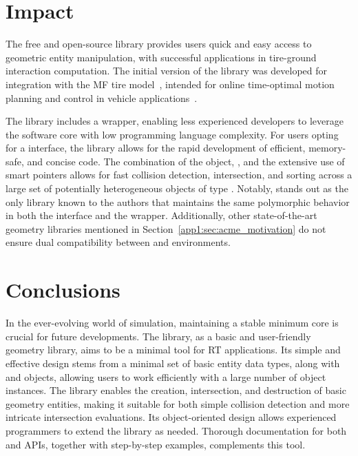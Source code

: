 \section{Impact}

The free and open-source \Acme{} library provides users quick and easy access to geometric entity manipulation, with successful applications in tire-ground interaction computation. The initial version of the library was developed for integration with the \ac{MF} tire model~\cite{pacejka2012tire}, intended for online time-optimal motion planning and control in vehicle applications~\cite{piccinini2022predictive,piccinini2023physics}.

The library includes a \Matlab{} \Mex{} wrapper, enabling less experienced developers to leverage the software core with low programming language complexity. For users opting for a \cpp{} interface, the library allows for the rapid development of efficient, memory-safe, and concise code. The combination of the \Collection{} object, \AabbTree{}, and the extensive use of smart pointers allows for fast collision detection, intersection, and sorting across a large set of potentially heterogeneous objects of type \Entity{}. Notably, \Acme{} stands out as the only library known to the authors that maintains the same polymorphic behavior in both the \cpp{} interface and the \Matlab{} \Mex{} wrapper. Additionally, other state-of-the-art geometry libraries mentioned in Section~\ref{app1:sec:acme_motivation} do not ensure dual compatibility between \cpp{} and \Matlab{} environments.


\section{Conclusions}

In the ever-evolving world of simulation, maintaining a stable minimum core is crucial for future developments. The \Acme{} library, as a basic and user-friendly \cpp{} geometry library, aims to be a minimal tool for \ac{RT} applications. Its simple and effective design stems from a minimal set of basic entity data types, along with \AabbTree{} and \Collection{} objects, allowing users to work efficiently with a large number of object instances. The library enables the creation, intersection, and destruction of basic geometry entities, making it suitable for both simple collision detection and more intricate intersection evaluations. Its object-oriented design allows experienced programmers to extend the library as needed. Thorough documentation for both \cpp{} and \Matlab{} \acp{API}, together with step-by-step examples, complements this tool.

